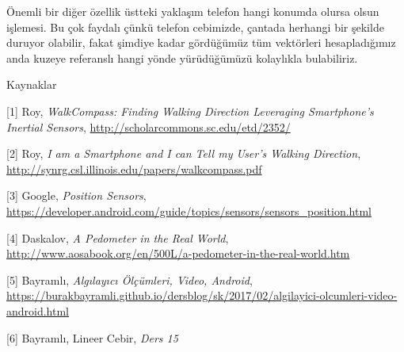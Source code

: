 \documentclass[12pt,fleqn]{article}\usepackage{../../common}
\begin{document}
Önemli bir diğer özellik üstteki yaklaşım telefon hangi konumda olursa
olsun işlemesi. Bu çok faydalı çünkü telefon cebimizde, çantada herhangi
bir şekilde duruyor olabilir, fakat şimdiye kadar gördüğümüz tüm vektörleri
hesapladığımız anda kuzeye referanslı hangi yönde yürüdüğümüzü kolaylıkla
bulabiliriz.

Kaynaklar

[1] Roy, {\em WalkCompass: Finding Walking Direction Leveraging Smartphone's Inertial Sensors}, 
    \url{http://scholarcommons.sc.edu/etd/2352/}

[2] Roy, {\em I am a Smartphone and I can Tell my User's Walking Direction}, 
    \url{http://synrg.csl.illinois.edu/papers/walkcompass.pdf} 

[3] Google, {\em Position Sensors}, 
    \url{https://developer.android.com/guide/topics/sensors/sensors_position.html}

[4] Daskalov, {\em A Pedometer in the Real World}, 
    \url{http://www.aosabook.org/en/500L/a-pedometer-in-the-real-world.htm}

[5] Bayramlı, 
    {\em Algılayıcı Ölçümleri, Video, Android}, 
    \url{https://burakbayramli.github.io/dersblog/sk/2017/02/algilayici-olcumleri-video-android.html}

[6] Bayramlı, Lineer Cebir, {\em Ders 15}
\end{document}
